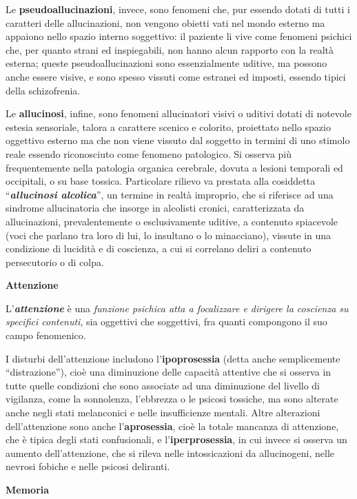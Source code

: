 \documentclass[]{article}
\begin{document}
Le \textbf{pseudoallucinazioni}, invece, sono fenomeni che, pur essendo
dotati di tutti i caratteri delle allucinazioni, non vengono obietti
vati nel mondo esterno ma appaiono nello spazio interno soggettivo: il
paziente li vive come fenomeni psichici che, per quanto strani ed
inspiegabili, non hanno alcun rapporto con la realtà esterna; queste
pseudoallucinazioni sono essenzialmente uditive, ma possono anche essere
visive, e sono spesso vissuti come estranei ed imposti, essendo tipici
della schizofrenia.

Le \textbf{allucinosi}, infine, sono fenomeni allucinatori visivi o
uditivi dotati di notevole estesia sensoriale, talora a carattere
scenico e colorito, proiettato nello spazio oggettivo esterno ma che non
viene vissuto dal soggetto in termini di uno stimolo reale essendo
riconosciuto come fenomeno patologico. Si osserva più frequentemente
nella patologia organica cerebrale, dovuta a lesioni temporali ed
occipitali, o su base tossica. Particolare rilievo va prestata alla
cosiddetta ``\textbf{\emph{allucinosi alcolica}}'', un termine in realtà
improprio, che si riferisce ad una sindrome allucinatoria che insorge in
alcolisti cronici, caratterizzata da allucinazioni, prevalentemente o
esclusivamente uditive, a contenuto spiacevole (voci che parlano tra
loro di lui, lo insultano o lo minacciano), vissute in una condizione di
lucidità e di coscienza, a cui si correlano deliri a contenuto
persecutorio o di colpa.

\textbf{Attenzione}

L'\textbf{\emph{attenzione}} è una \emph{funzione psichica atta a
focalizzare e dirigere la coscienza su specifici contenuti}, sia
oggettivi che soggettivi, fra quanti compongono il suo campo fenomenico.

I disturbi dell'attenzione includono l'\textbf{ipoprosessia} (detta
anche semplicemente ``distrazione''), cioè una diminuzione delle
capacità attentive che si osserva in tutte quelle condizioni che sono
associate ad una diminuzione del livello di vigilanza, come la
sonnolenza, l'ebbrezza o le psicosi tossiche, ma sono alterate anche
negli stati melanconici e nelle insufficienze mentali. Altre alterazioni
dell'attenzione sono anche l'\textbf{aprosessia}, cioè la totale
mancanza di attenzione, che è tipica degli stati confusionali, e
l'\textbf{iperprosessia}, in cui invece si osserva un aumento
dell'attenzione, che si rileva nelle intossicazioni da allucinogeni,
nelle nevrosi fobiche e nelle psicosi deliranti.

\textbf{Memoria}
\end{document}
